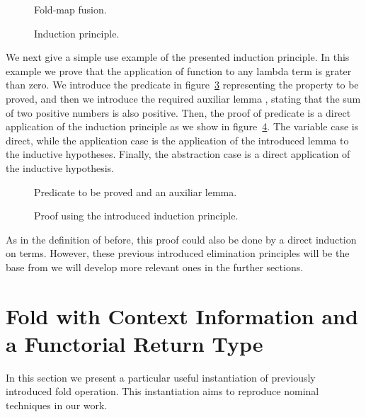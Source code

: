 \documentclass{book}
\begin{document}
\begin{figure}[h!]
  \caption{Fold-map fusion.}
\label{fig:ind}
\end{figure}

\begin{figure}[h!]
  \caption{Induction principle.}
\label{fig:ind2}
\end{figure}



We next give a simple use example of the presented induction principle. In this example we prove that the application of  function to any lambda term is grater than zero. We introduce the predicate  in figure~\ref{fig:prop} representing the property to be proved, and then we introduce the required auxiliar lemma , stating that the sum of two positive numbers is also positive. Then, the proof of  predicate is a direct application of the induction principle as we show in figure~\ref{fig:proof}. The variable case is direct, while the application case is the application of the introduced lemma  to the inductive hypotheses. Finally, the abstraction case is a direct application of the inductive hypothesis.

\begin{figure}[h!]
\caption{Predicate to be proved and an auxiliar lemma.}
\label{fig:prop}
\end{figure}

\begin{figure}[h!]
\caption{Proof using the introduced induction principle.}
\label{fig:proof}
\end{figure}

As in the definition of  before, this proof could also be done by a direct induction on terms. However, these previous introduced elimination principles will be the base from we will develop more relevant ones in the further sections.

\section{Fold with Context Information and a Functorial Return Type}

In this section we present a particular useful instantiation of previously introduced fold operation. This instantiation aims to reproduce nominal techniques in our work. %
\end{document}
